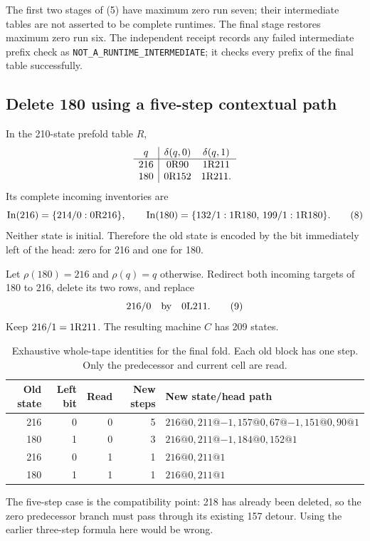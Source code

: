The first two stages of (5) have maximum zero run seven; their intermediate
tables are not asserted to be complete runtimes. The final stage restores
maximum zero run six. The independent receipt records any failed intermediate
prefix check as \texttt{NOT\_A\_RUNTIME\_INTERMEDIATE}; it checks every prefix
of the final table successfully.

\subsection{Delete 180 using a five-step contextual path}
In the 210-state prefold table \(R\),
\[
\begin{array}{c|cc}
q&\delta(q,0)&\delta(q,1)\\
\hline
216&0\mathrm{R}90&1\mathrm{R}211\\
180&0\mathrm{R}152&1\mathrm{R}211.
\end{array}
\]
Its complete incoming inventories are
\[
 \operatorname{In}(216)=\{214/0:0\mathrm{R}216\},\qquad
 \operatorname{In}(180)=
 \{132/1:1\mathrm{R}180,\,199/1:1\mathrm{R}180\}.
 \tag{8}
\]
Neither state is initial. Therefore the old state is encoded by the bit
immediately left of the head: zero for 216 and one for 180.

Let \(\rho(180)=216\) and \(\rho(q)=q\) otherwise. Redirect both incoming targets
of 180 to 216, delete its two rows, and replace
\[
                           216/0\quad\text{by}\quad0\mathrm{L}211.
 \tag{9}
\]
Keep \(216/1=1\mathrm{R}211\). The resulting machine \(C\) has 209 states.

\begin{table}[ht]
\centering\small
\begin{tabularx}{\linewidth}{@{}rrrrX@{}}
\toprule
Old state & Left bit & Read & New steps & New state/head path\\
\midrule
216&0&0&5&\(216@0,211@{-1},157@0,67@{-1},151@0,90@1\)\\
180&1&0&3&\(216@0,211@{-1},184@0,152@1\)\\
216&0&1&1&\(216@0,211@1\)\\
180&1&1&1&\(216@0,211@1\)\\
\bottomrule
\end{tabularx}
\caption{Exhaustive whole-tape identities for the final fold. Each old block
has one step. Only the predecessor and current cell are read.}
\label{tab:fold}
\end{table}

The five-step case is the compatibility point: 218 has already been deleted,
so the zero predecessor branch must pass through its existing 157 detour.
Using the earlier three-step formula here would be wrong.

